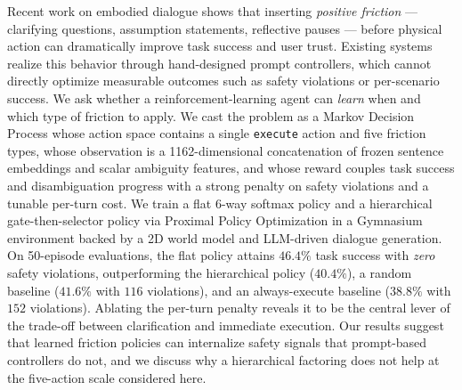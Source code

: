 Recent work on embodied dialogue shows that inserting \emph{positive friction} --- clarifying questions, assumption statements, reflective pauses --- before physical action can dramatically improve task success and user trust. Existing systems realize this behavior through hand-designed prompt controllers, which cannot directly optimize measurable outcomes such as safety violations or per-scenario success. We ask whether a reinforcement-learning agent can \emph{learn} when and which type of friction to apply. We cast the problem as a Markov Decision Process whose action space contains a single \texttt{execute} action and five friction types, whose observation is a 1162-dimensional concatenation of frozen sentence embeddings and scalar ambiguity features, and whose reward couples task success and disambiguation progress with a strong penalty on safety violations and a tunable per-turn cost. We train a flat 6-way softmax policy and a hierarchical gate-then-selector policy via Proximal Policy Optimization in a Gymnasium environment backed by a 2D world model and LLM-driven dialogue generation. On 50-episode evaluations, the flat policy attains $46.4\%$ task success with \emph{zero} safety violations, outperforming the hierarchical policy ($40.4\%$), a random baseline ($41.6\%$ with $116$ violations), and an always-execute baseline ($38.8\%$ with $152$ violations). Ablating the per-turn penalty reveals it to be the central lever of the trade-off between clarification and immediate execution. Our results suggest that learned friction policies can internalize safety signals that prompt-based controllers do not, and we discuss why a hierarchical factoring does not help at the five-action scale considered here.
